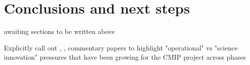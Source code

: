 \documentclass[gmd, preprint]{copernicus}
\def\cred#1{{\color{red}#1}}
\begin{document}
\section{Conclusions and next steps} %
\label{sec:Conclusions}
\cred{awaiting sections to be written above}

\cred{Explicitly call out \citet{shukla_strategies_2009,shukla_toward_2010}, \citep{jakob_need_2023}, \citep{stevens_perspective_2024} commentary papers to highlight "operational" vs "science innovation" pressures that have been growing for the CMIP project across phases}








\appendix
\end{document}
